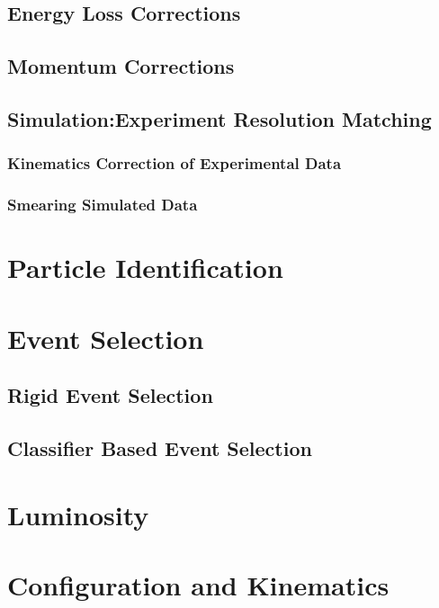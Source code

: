     \subsection{Energy Loss Corrections}
    \subsection{Momentum Corrections}
    \subsection{Simulation:Experiment Resolution Matching}
        \subsubsection{Kinematics Correction of Experimental Data}
        \subsubsection{Smearing Simulated Data}

\section{Particle Identification}

\section{Event Selection}
    \subsection{Rigid Event Selection}
    \subsection{Classifier Based Event Selection}
    
    
    
\section{Luminosity}
    
    
\section{Configuration and Kinematics}

